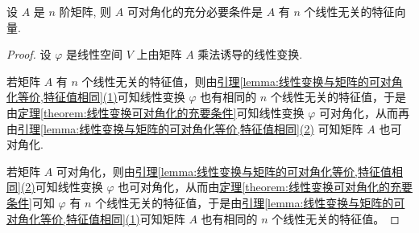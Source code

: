 \documentclass[lang=cn,newtx,10pt,scheme=chinese]{elegantbook}
\begin{document}
\begin{theorem}[矩阵可对角化的充要条件]\label{theorem:矩阵可对角化的充要条件}
设 $A$ 是 $n$ 阶矩阵, 则 $A$ 可对角化的充分必要条件是 $A$ 有 $n$ 个线性无关的特征向量.
\end{theorem}
\begin{proof}
设 $\varphi$ 是线性空间 $V$ 上由矩阵 $A$ 乘法诱导的线性变换.

若矩阵 $A$ 有 $n$ 个线性无关的特征值，则由\hyperref[lemma:线性变换与矩阵的可对角化等价,特征值相同]{引理\ref{lemma:线性变换与矩阵的可对角化等价,特征值相同}(1)}可知线性变换 $\varphi$ 也有相同的 $n$ 个线性无关的特征值，于是由\hyperref[theorem:线性变换可对角化的充要条件]{定理\ref{theorem:线性变换可对角化的充要条件}}可知线性变换 $\varphi$ 可对角化，从而再由\hyperref[lemma:线性变换与矩阵的可对角化等价,特征值相同]{引理\ref{lemma:线性变换与矩阵的可对角化等价,特征值相同}(2)} 可知矩阵 $A$ 也可对角化.

若矩阵 $A$ 可对角化，则由\hyperref[lemma:线性变换与矩阵的可对角化等价,特征值相同]{引理\ref{lemma:线性变换与矩阵的可对角化等价,特征值相同}(2)}可知线性变换 $\varphi$ 也可对角化，从而由\hyperref[theorem:线性变换可对角化的充要条件]{定理\ref{theorem:线性变换可对角化的充要条件}}可知 $\varphi$ 有 $n$ 个线性无关的特征值，于是由\hyperref[lemma:线性变换与矩阵的可对角化等价,特征值相同]{引理\ref{lemma:线性变换与矩阵的可对角化等价,特征值相同}(1)}可知矩阵 $A$ 也有相同的 $n$ 个线性无关的特征值。
\end{proof}
\end{document}
